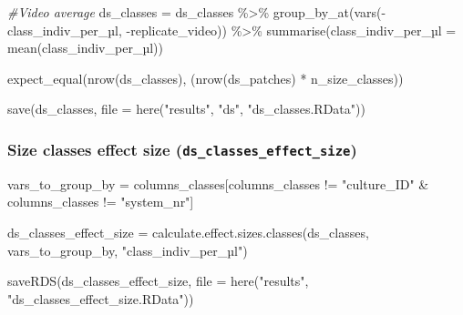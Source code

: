 \documentclass[
]{article}
\newenvironment{Shaded}{\begin{snugshade}}{\end{snugshade}}
\newcommand{\AttributeTok}[1]{\textcolor[rgb]{0.77,0.63,0.00}{#1}}
\newcommand{\CommentTok}[1]{\textcolor[rgb]{0.56,0.35,0.01}{\textit{#1}}}
\newcommand{\FunctionTok}[1]{\textcolor[rgb]{0.00,0.00,0.00}{#1}}
\newcommand{\NormalTok}[1]{#1}
\newcommand{\OtherTok}[1]{\textcolor[rgb]{0.56,0.35,0.01}{#1}}
\newcommand{\SpecialCharTok}[1]{\textcolor[rgb]{0.00,0.00,0.00}{#1}}
\newcommand{\StringTok}[1]{\textcolor[rgb]{0.31,0.60,0.02}{#1}}
\begin{document}
\begin{Shaded}
\begin{Highlighting}[]
\CommentTok{\#Video average}
\NormalTok{ds\_classes }\OtherTok{=}\NormalTok{ ds\_classes }\SpecialCharTok{\%\textgreater{}\%}
  \FunctionTok{group\_by\_at}\NormalTok{(}\FunctionTok{vars}\NormalTok{(}\SpecialCharTok{{-}}\NormalTok{class\_indiv\_per\_µl,}
                   \SpecialCharTok{{-}}\NormalTok{replicate\_video)) }\SpecialCharTok{\%\textgreater{}\%}
  \FunctionTok{summarise}\NormalTok{(class\_indiv\_per\_µ}\AttributeTok{l =} \FunctionTok{mean}\NormalTok{(class\_indiv\_per\_µl))}

\FunctionTok{expect\_equal}\NormalTok{(}\FunctionTok{nrow}\NormalTok{(ds\_classes),}
\NormalTok{             (}\FunctionTok{nrow}\NormalTok{(ds\_patches) }\SpecialCharTok{*}\NormalTok{ n\_size\_classes))}
\end{Highlighting}
\end{Shaded}

\begin{Shaded}
\begin{Highlighting}[]
\FunctionTok{save}\NormalTok{(ds\_classes, }\AttributeTok{file =} \FunctionTok{here}\NormalTok{(}\StringTok{"results"}\NormalTok{, }\StringTok{"ds"}\NormalTok{, }\StringTok{"ds\_classes.RData"}\NormalTok{))}
\end{Highlighting}
\end{Shaded}

\hypertarget{size-classes-effect-size-ds_classes_effect_size}{%
\subsubsection{\texorpdfstring{Size classes effect size
(\texttt{ds\_classes\_effect\_size})}{Size classes effect size (ds\_classes\_effect\_size)}}\label{size-classes-effect-size-ds_classes_effect_size}}

\begin{Shaded}
\begin{Highlighting}[]
\NormalTok{vars\_to\_group\_by }\OtherTok{=}\NormalTok{ columns\_classes[columns\_classes }\SpecialCharTok{!=} \StringTok{"culture\_ID"} \SpecialCharTok{\&}\NormalTok{ columns\_classes }\SpecialCharTok{!=} \StringTok{"system\_nr"}\NormalTok{]}

\NormalTok{ds\_classes\_effect\_size }\OtherTok{=} \FunctionTok{calculate.effect.sizes.classes}\NormalTok{(ds\_classes,}
\NormalTok{                                                        vars\_to\_group\_by,}
                                                        \StringTok{"class\_indiv\_per\_µl"}\NormalTok{)}

\FunctionTok{saveRDS}\NormalTok{(ds\_classes\_effect\_size, }\AttributeTok{file =} \FunctionTok{here}\NormalTok{(}\StringTok{"results"}\NormalTok{, }\StringTok{"ds\_classes\_effect\_size.RData"}\NormalTok{))}
\end{Highlighting}
\end{Shaded}
\end{document}
